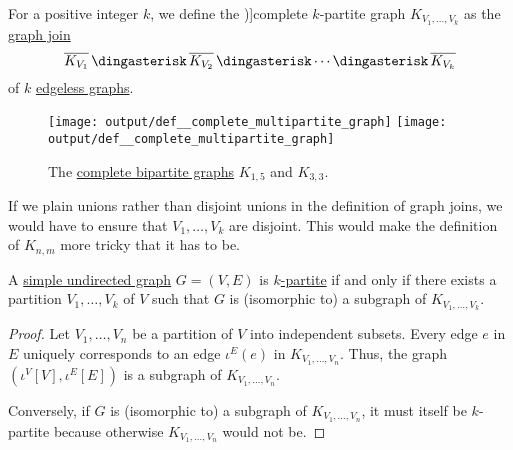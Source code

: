 \begin{definition}\label{def:complete_multipartite_graph}
  For a positive integer \( k \), we define the \term[ru=полный \( k \)-дольный (граф) (\cite[\S 1]{Емеличев1990})]{complete \( k \)-partite} graph \( K_{V_1,\ldots,V_k} \) as the \hyperref[def:graph_join]{graph join}
  \begin{equation*}
    \oline{K_{V_1}} \Ast \oline{K_{V_2}} \Ast \cdots \Ast \oline{K_{V_k}}
  \end{equation*}
  of \( k \) \hyperref[def:edgeless_graph]{edgeless graphs}.

  \begin{figure}[!ht]
    \hfill
    \texttt{[image: output/def\_\_complete\_multipartite\_graph]}
    \hfill
    \texttt{[image: output/def\_\_complete\_multipartite\_graph]}
    \hfill
    \hfill
    \caption{The \hyperref[def:complete_multipartite_graph]{complete bipartite graphs} \( K_{1,5} \) and \( K_{3,3} \).}\label{fig:def:complete_multipartite_graph}
  \end{figure}
\end{definition}
\begin{comments}
  \item If we plain unions rather than disjoint unions in the definition of graph joins, we would have to ensure that \( V_1, \ldots, V_k \) are disjoint. This would make the definition of \( K_{n,m} \) more tricky that it has to be.
\end{comments}

\begin{proposition}\label{thm:complete_multipartite_subgraphs}
  A \hyperref[def:undirected_graph]{simple undirected graph} \( G = (V, E) \) is \hyperref[def:multipartite_graph]{\( k \)-partite} if and only if there exists a partition \( V_1, \ldots, V_k \) of \( V \) such that \( G \) is (isomorphic to) a subgraph of \( K_{V_1, \ldots, V_k} \).
\end{proposition}
\begin{proof}
  \SufficiencySubProof Let \( V_1, \ldots, V_n \) be a partition of \( V \) into independent subsets. Every edge \( e \) in \( E \) uniquely corresponds to an edge \( \iota^E(e) \) in \( K_{V_1, \ldots, V_n} \). Thus, the graph \( (\iota^V[V], \iota^E[E]) \) is a subgraph of \( K_{V_1, \ldots, V_n} \).

  \NecessitySubProof Conversely, if \( G \) is (isomorphic to) a subgraph of \( K_{V_1, \ldots, V_n} \), it must itself be \( k \)-partite because otherwise \( K_{V_1, \ldots, V_n} \) would not be.
\end{proof}

